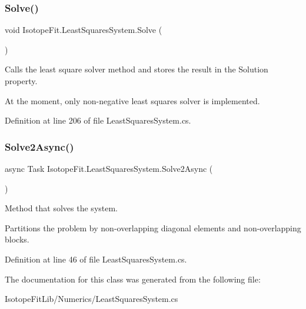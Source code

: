 \subsubsection{\texorpdfstring{Solve()}{Solve()}}
{\footnotesize\ttfamily void Isotope\+Fit.\+Least\+Squares\+System.\+Solve (\begin{DoxyParamCaption}{ }\end{DoxyParamCaption})}



Calls the least square solver method and stores the result in the Solution property. 

At the moment, only non-\/negative least squares solver is implemented. 

Definition at line 206 of file Least\+Squares\+System.\+cs.

\mbox{\label{class_isotope_fit_1_1_least_squares_system_ad831a418d7e7601dc7a64f5f7143534f}} 
\subsubsection{\texorpdfstring{Solve2\+Async()}{Solve2Async()}}
{\footnotesize\ttfamily async Task Isotope\+Fit.\+Least\+Squares\+System.\+Solve2\+Async (\begin{DoxyParamCaption}{ }\end{DoxyParamCaption})}



Method that solves the system. 

Partitions the problem by non-\/overlapping diagonal elements and non-\/overlapping blocks. 

Definition at line 46 of file Least\+Squares\+System.\+cs.



The documentation for this class was generated from the following file\+:\begin{DoxyCompactItemize}
\item 
Isotope\+Fit\+Lib/\+Numerics/Least\+Squares\+System.\+cs\end{DoxyCompactItemize}
